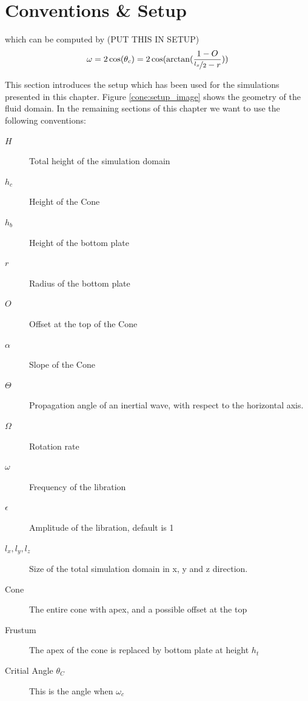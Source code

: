 \newpage

\section{Conventions \& Setup}
\label{cone:convsetup}

which can be computed by (PUT THIS IN SETUP)
\begin{align}
    \omega = 2\cos(\theta_c) = 2\cos(\arctan(\frac{1 - O}{\nicefrac{l_x}{2} - r}))
\end{align}

This section introduces the setup which has been used for the simulations presented in this chapter.
Figure \ref{cone:setup_image} shows the geometry of the fluid domain.
In the remaining sections of this chapter we want to use the following conventions:

\begin{multicols}{2}
\begin{description}
    \item[$H$]{Total height of the simulation domain}
    \item[$h_c$]{Height of the Cone}
    \item[$h_b$]{Height of the bottom plate}
    \item[$r$]{Radius of the bottom plate}
    \item[$O$]{Offset at the top of the Cone}
    \item[$\alpha$]{Slope of the Cone}
    \item[$\Theta$]{Propagation angle of an inertial wave, with respect to the horizontal axis.}
    \item[$\Omega$]{Rotation rate}
    \item[$\omega$]{Frequency of the libration}
    \item[$\epsilon$]{Amplitude of the libration, default is 1}%
    \item[$l_x, l_y, l_z$]{Size of the total simulation domain in x, y and z direction.}
    \item[Cone] {The entire cone with apex, and a possible offset at the top}
    \item[Frustum]{The apex of the cone is replaced by bottom plate at height $h_t$}
    \item[Critial Angle $\theta_C$]{This is the angle when $\omega_c$}
\end{description}
\end{multicols}



